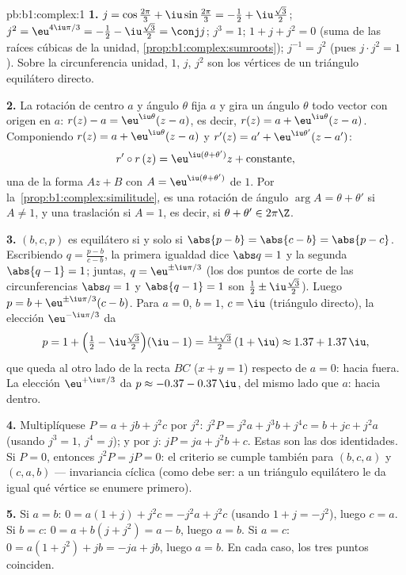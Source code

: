 \begin{solution}{pb:b1:complex:1}
\textbf{1.} $j = \cos\frac{2\pi}3 + \iu\sin\frac{2\pi}3 = -\frac12
+ \iu\frac{\sqrt3}2$; $j^2 = \eu^{4\iu\pi/3} = -\frac12 -
\iu\frac{\sqrt3}2 = \conj j$; $j^3 = 1$; $1 + j + j^2 = 0$ (suma de
las raíces cúbicas de la unidad, \cref{prop:b1:complex:sumroots});
$j^{-1} = j^2$ (pues $j \cdot j^2 = 1$). Sobre la circunferencia
unidad, $1$, $j$, $j^2$ son los vértices de un triángulo equilátero directo.

\textbf{2.} La rotación de centro $a$ y ángulo $\theta$ fija $a$ y gira
un ángulo $\theta$ todo vector con origen en $a$: $r(z) - a =
\eu^{\iu\theta}(z - a)$, es decir, $r(z) = a + \eu^{\iu\theta}(z - a)$.
Componiendo $r(z) = a + \eu^{\iu\theta}(z-a)$ y $r'(z) = a' +
\eu^{\iu\theta'}(z-a')$:
\[
r' \circ r\,(z) = \eu^{\iu(\theta + \theta')} z +
\text{constante},
\]
una  de la forma $Az + B$ con
$A = \eu^{\iu(\theta+\theta')}$ de  $1$. Por
la~\cref{prop:b1:complex:similitude}, es una rotación de ángulo
$\arg A = \theta + \theta'$ si $A \neq 1$, y una traslación si $A = 1$,
es decir, si $\theta + \theta' \in 2\pi\Z$.

\textbf{3.} $(b, c, p)$ es equilátero si y solo si $\abs{p - b} =
\abs{c - b} = \abs{p - c}$. Escribiendo $q = \frac{p - b}{c - b}$, la
primera igualdad dice $\abs q = 1$ y la segunda $\abs{q - 1} = 1$;
juntas, $q = \eu^{\pm\iu\pi/3}$ (los dos puntos de corte de las
circunferencias $\abs q = 1$ y $\abs{q - 1} = 1$ son
$\frac12 \pm \iu\frac{\sqrt3}2$). Luego
$p = b + \eu^{\pm\iu\pi/3}(c - b)$. Para $a = 0$, $b = 1$, $c = \iu$
(triángulo directo), la elección $\eu^{-\iu\pi/3}$ da
\[
p = 1 + \Bigl(\tfrac12 - \iu\tfrac{\sqrt3}2\Bigr)(\iu - 1)
= \tfrac{1 + \sqrt3}2\,(1 + \iu) \approx 1.37 + 1.37\,\iu ,
\]
que queda al otro lado de la recta $BC$ ($x + y = 1$) respecto de
$a = 0$: hacia fuera. La elección $\eu^{+\iu\pi/3}$ da
$p \approx -0.37 - 0.37\,\iu$, del mismo lado que $a$: hacia dentro.

\textbf{4.} Multiplíquese $P = a + jb + j^2c$ por $j^2$: $j^2 P = j^2 a +
j^3 b + j^4 c = b + jc + j^2 a$ (usando $j^3 = 1$, $j^4 = j$); y por
$j$: $jP = ja + j^2 b + c$. Estas son las dos identidades. Si $P = 0$,
entonces $j^2 P = jP = 0$: el criterio se cumple también para
$(b, c, a)$ y $(c, a, b)$ --- invariancia cíclica (como debe ser: a un
triángulo equilátero le da igual qué vértice se enumere primero).

\textbf{5.} Si $a = b$: $0 = a(1 + j) + j^2 c = -j^2 a + j^2 c$ (usando
$1 + j = -j^2$), luego $c = a$. Si $b = c$: $0 = a + b(j + j^2) = a - b$,
luego $a = b$. Si $a = c$: $0 = a(1 + j^2) + jb = -ja + jb$, luego
$a = b$. En cada caso, los tres puntos coinciden.


\end{solution}
